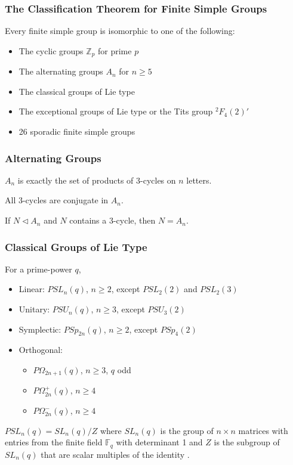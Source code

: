\documentclass{beamer}
\begin{document}
\begin{frame}
	\frametitle{The Classification Theorem for Finite Simple Groups \cite{wilson}}
	\begin{theorem}
	Every finite simple group is isomorphic to one of the following:
	\begin{itemize}
	\item
	The cyclic groups $\mathbb{Z}_p$ for prime $p$
	\item
	The alternating groups $A_n$ for $n \ge 5$
	\item
	The classical groups of Lie type
	\item
	The exceptional groups of Lie type or the Tits group ${}^2F_4(2)'$
	\item
	26 sporadic finite simple groups		
	\end{itemize}
	\end{theorem}
\end{frame}

\begin{frame}
	\frametitle{Alternating Groups}
	\begin{lemma}
		$A_n$ is exactly the set of products of 3-cycles on $n$ letters.
	\end{lemma}
	\begin{lemma}
		All 3-cycles are conjugate in $A_n$.
	\end{lemma}
	\begin{corollary}
		If $N \triangleleft A_n$ and $N$ contains a 3-cycle, then $N = A_n$.
	\end{corollary}
\end{frame}

\begin{frame}
	\frametitle{Classical Groups of Lie Type}
	For a prime-power $q$,
		\begin{itemize}
		\item
		Linear: $PSL_n(q)$, $n \ge 2$, except $PSL_2(2)$ and $PSL_2(3)$
		\item
		Unitary: $PSU_n(q)$, $n \ge 3$, except $PSU_3(2)$
		\item
		Symplectic: $PSp_{2n}(q)$, $n \ge 2$, except $PSp_4(2)$
		\item
		Orthogonal:
		\begin{itemize}
			\item
			$P\Omega_{2n+1}(q)$, $n \ge 3$, $q$ odd
			\item
			$P\Omega^+_{2n}(q)$, $n \ge 4$
			\item
			$P\Omega^-_{2n}(q)$, $n \ge 4$
		\end{itemize}
	\end{itemize}
	\begin{example}
		$PSL_n(q) = SL_n(q) / Z$ where $SL_n(q)$ is the group of $n \times n$ matrices with entries from the finite field $\mathbb{F}_q$ with determinant 1 and $Z$ is the subgroup of $SL_n(q)$ that are scalar multiples of the identity \cite{wilson}.
	\end{example}
\end{frame}
\end{document}

